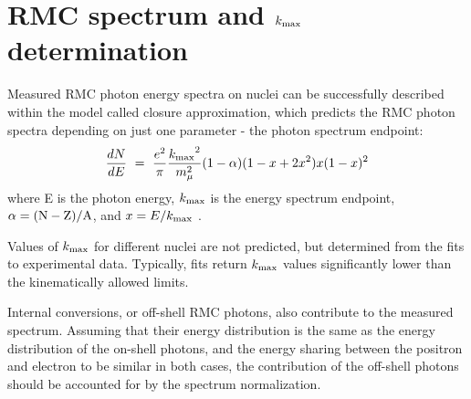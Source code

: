 \newpage
\section {RMC spectrum and $\mbox{$k_{\rm max}$}$ determination}

Measured RMC photon energy spectra on nuclei can be successfully described
within the model called closure approximation, which predicts the RMC photon
spectra depending on just one parameter - the photon spectrum endpoint:
$$
    \frac{dN}{dE} ~=~ \frac{e^2}{\pi} \frac{\mbox{$k_{\rm max}$}^2}{ m_{\mu}^2} (1 - \alpha) (1-x+2x^2)x(1-x)^2
$$
where E is the photon energy, $\mbox{$k_{\rm max}$}$ is the energy spectrum endpoint, $\rm \alpha = (N-Z)/A$,
and $x = E/\mbox{$k_{\rm max}$}$ \cite{Christillin_1980}.

Values of $\mbox{$k_{\rm max}$}$ for different nuclei are not predicted, but determined from the fits
to experimental data. Typically, fits return $\mbox{$k_{\rm max}$}$ values significantly lower than
the kinematically allowed limits. 

Internal conversions, or off-shell RMC photons, also contribute to the measured
spectrum. Assuming that their energy distribution is the same as the energy distribution
of the on-shell photons, and the energy sharing between the positron and electron
to be similar in both cases, the contribution of the off-shell photons should be
accounted for by the spectrum normalization.

